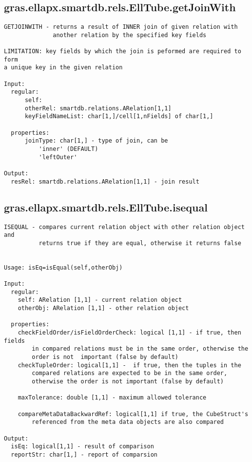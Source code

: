 \subsection{\texorpdfstring{gras.ellapx.smartdb.rels.EllTube.getJoinWith}{getJoinWith}}\label{method:gras.ellapx.smartdb.rels.EllTube.getJoinWith}
\begin{verbatim}
GETJOINWITH - returns a result of INNER join of given relation with
              another relation by the specified key fields

LIMITATION: key fields by which the join is peformed are required to form
a unique key in the given relation

Input:
  regular:
      self:
      otherRel: smartdb.relations.ARelation[1,1]
      keyFieldNameList: char[1,]/cell[1,nFields] of char[1,]

  properties:
      joinType: char[1,] - type of join, can be
          'inner' (DEFAULT)
          'leftOuter'

Output:
  resRel: smartdb.relations.ARelation[1,1] - join result
\end{verbatim}
\subsection{\texorpdfstring{gras.ellapx.smartdb.rels.EllTube.isequal}{isequal}}\label{method:gras.ellapx.smartdb.rels.EllTube.isequal}
\begin{verbatim}
ISEQUAL - compares current relation object with other relation object and
          returns true if they are equal, otherwise it returns false


Usage: isEq=isEqual(self,otherObj)

Input:
  regular:
    self: ARelation [1,1] - current relation object
    otherObj: ARelation [1,1] - other relation object

  properties:
    checkFieldOrder/isFieldOrderCheck: logical [1,1] - if true, then fields
        in compared relations must be in the same order, otherwise the
        order is not  important (false by default)
    checkTupleOrder: logical[1,1] -  if true, then the tuples in the
        compared relations are expected to be in the same order,
        otherwise the order is not important (false by default)

    maxTolerance: double [1,1] - maximum allowed tolerance

    compareMetaDataBackwardRef: logical[1,1] if true, the CubeStruct's
        referenced from the meta data objects are also compared

Output:
  isEq: logical[1,1] - result of comparison
  reportStr: char[1,] - report of comparsion
\end{verbatim}
